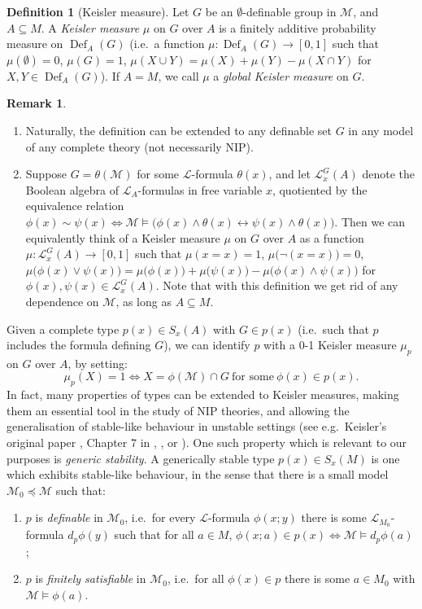 \documentclass[a4paper]{report}
\newcommand{\ind}{\hspace{15pt}}
\renewcommand{\L}{\mathcal{L}}
\newcommand{\M}{\mathcal{M}}
\renewcommand{\iff}{\Leftrightarrow}
\newcommand{\siff}{\leftrightarrow}
\DeclareMathOperator{\Def}{Def}
\theoremstyle{definition}
\newtheorem{defn}[thm]{Definition}
\theoremstyle{remstyle}
\newtheorem{rem}[thm]{Remark}
\begin{document}
\begin{defn}[Keisler measure] Let $G$ be an $\emptyset$-definable group in $\M$, and $A\subseteq M$. A \emph{Keisler measure} $\mu$ on $G$ over $A$ is a finitely additive probability measure on $\Def_A(G)$ (i.e.\ a function $\mu:\Def_A(G)\to[0,1]$ such that $\mu(\emptyset)=0$, $\mu(G)=1$, $\mu(X\cup Y)=\mu(X)+\mu(Y)-\mu(X\cap Y)$ for $X,Y\in\Def_A(G)$). If $A=M$, we call $\mu$ a \emph{global Keisler measure} on $G$.
\end{defn}

\begin{rem}\
	\begin{enumerate}
		\item Naturally, the definition can be extended to any definable set $G$ in any model of any complete theory (not necessarily NIP).
		\item Suppose $G=\theta(\M)$ for some $\L$-formula $\theta(x)$, and let $\L^G_x(A)$ denote the Boolean algebra of $\L_A$-formulas in free variable $x$, quotiented by the equivalence relation $\phi(x)\sim\psi(x)\iff\M\models\big(\phi(x)\wedge\theta(x)\siff\psi(x)\wedge\theta(x)\big)$.
		      Then we can equivalently think of a Keisler measure $\mu$ on $G$ over $A$ as a function $\mu:\L^G_x(A)\to[0,1]$ such that $\mu(x=x)=1$, $\mu\big(\neg(x=x)\big)=0$, $\mu\big(\phi(x)\vee\psi(x)\big)=\mu\big(\phi(x)\big)+\mu\big(\psi(x)\big)-\mu\big(\phi(x)\wedge\psi(x)\big)$ for $\phi(x),\psi(x)\in\L^G_x(A)$. Note that with this definition we get rid of any dependence on $\M$, as long as $A\subseteq M$.
	\end{enumerate}
\end{rem}

\ind Given a complete type $p(x)\in S_x(A)$ with $G\in p(x)$ (i.e.\ such that $p$ includes the formula defining $G$), we can identify $p$ with a 0-1 Keisler measure $\mu_p$ on $G$ over $A$, by setting:
\begin{equation*}
	\mu_p(X) = 1 \iff X = \phi(\M)\cap G\ \text{for some}\ \phi(x)\in p(x).
\end{equation*}
In fact, many properties of types can be extended to Keisler measures, making them an essential tool in the study of NIP theories, and allowing the generalisation of stable-like behaviour in unstable settings (see e.g.\ Keisler's original paper \cite{keisler}, Chapter 7 in \cite{nip guide}, \cite{groups measures nip}, or \cite{generically}). One such property which is relevant to our purposes is \emph{generic stability}. A generically stable type $p(x)\in S_x(M)$ is one which exhibits stable-like behaviour, in the sense that there is a small model $\M_0\preceq\M$ such that:
\begin{enumerate}
	\item $p$ is \emph{definable} in $\M_0$, i.e.\ for every $\L$-formula $\phi(x;y)$ there is some $\L_{M_0}$-formula $d_p\phi(y)$ such that for all $a\in M$, $\phi(x;a)\in p(x)\iff \M\models d_p\phi(a)$;
	\item $p$ is \emph{finitely satisfiable} in $\M_0$, i.e.\ for all $\phi(x)\in p$ there is some $a\in M_0$ with $\M\models\phi(a)$.
\end{enumerate}
\end{document}
